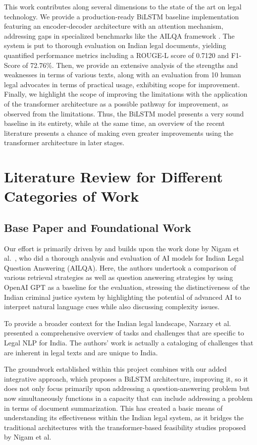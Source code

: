 \documentclass[preprint,12pt]{elsarticle}
\begin{document}
This work contributes along several dimensions to the state of the art on legal technology. We provide a production-ready BiLSTM baseline implementation featuring an encoder-decoder architecture with an attention mechanism, addressing gaps in specialized benchmarks like the AILQA framework \cite{ailqa2024}. The system is put to thorough evaluation on Indian legal documents, yielding quantified performance metrics including a ROUGE-L score of 0.7120 and F1-Score of 72.76\%. Then, we provide an extensive analysis of the strengths and weaknesses in terms of various texts, along with an evaluation from 10 human legal advocates in terms of practical usage, exhibiting scope for improvement. Finally, we highlight the scope of improving the limitations with the application of the transformer architecture as a possible pathway for improvement, as observed from the limitations. Thus, the BiLSTM model presents a very sound baseline in its entirety, while at the same time, an overview of the recent literature presents a chance of making even greater improvements using the transformer architecture in later stages.

\section{Literature Review for Different Categories of Work}

\subsection{Base Paper and Foundational Work}
Our effort is primarily driven by and builds upon the work done by Nigam et al.~\cite{nigam2023legal}, who did a thorough analysis and evaluation of AI models for Indian Legal Question Answering (AILQA). Here, the authors undertook a comparison of various retrieval strategies as well as question answering strategies by using OpenAI GPT as a baseline for the evaluation, stressing the distinctiveness of the Indian criminal justice system by highlighting the potential of advanced AI to interpret natural language cues while also discussing complexity issues.

To provide a broader context for the Indian legal landscape, Narzary et al.~\cite{narzary2025survey} presented a comprehensive overview of tasks and challenges that are specific to Legal NLP for India. The authors' work is actually a cataloging of challenges that are inherent in legal texts and are unique to India.

The groundwork established within this project combines with our added integrative approach, which proposes a BiLSTM architecture, improving it, so it does not only focus primarily upon addressing a question-answering problem but now simultaneously functions in a capacity that can include addressing a problem in terms of document summarization. This has created a basic means of understanding its effectiveness within the Indian legal system, as it bridges the traditional architectures with the transformer-based feasibility studies proposed by Nigam et al.
\end{document}
